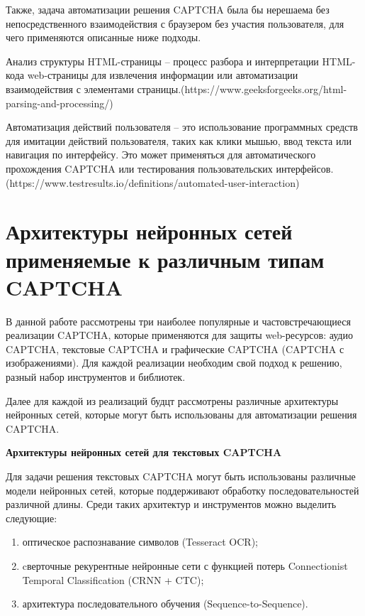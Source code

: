 Также, задача автоматизации решения CAPTCHA была бы нерешаема без 
непосредственного взаимодействия с браузером без участия пользователя, для чего 
применяются описанные ниже подходы.

Анализ структуры HTML-страницы -- процесс разбора и интерпретации HTML-кода 
web-страницы для извлечения информации или автоматизации взаимодействия с 
элементами страницы.(https://www.geeksforgeeks.org/html-parsing-and-processing/)

Автоматизация действий пользователя -- это использование программных средств для 
имитации действий пользователя, таких как клики мышью, ввод текста или навигация 
по интерфейсу. Это может применяться для автоматического прохождения CAPTCHA или 
тестирования пользовательских интерфейсов.(https://www.testresults.io/definitions/automated-user-interaction)

\section{Архитектуры нейронных сетей применяемые к различным типам CAPTCHA}

В данной работе рассмотрены три наиболее популярные и частовстречающиеся 
реализации CAPTCHA, которые применяются для защиты web-ресурсов: аудио CAPTCHA, 
текстовые CAPTCHA и графические CAPTCHA (CAPTCHA с изображениями). Для каждой 
реализации необходим свой подход к решению, разный набор инструментов и библиотек.

Далее для каждой из реализаций будцт рассмотрены различные архитектуры нейронных 
сетей, которые могут быть использованы для автоматизации решения CAPTCHA.

\textbf{Архитектуры нейронных сетей для текстовых CAPTCHA}

Для задачи решения текстовых CAPTCHA могут быть использованы различные модели 
нейронных сетей, которые поддерживают обработку последовательностей различной 
длины. Среди таких архитектур и инструментов можно выделить следующие:

\begin{enumerate}
    \item оптическое распознавание символов (Tesseract OCR);
    \item cверточные рекурентные нейронные сети с функцией потерь Connectionist 
    Temporal Classification (CRNN + CTC);
    \item архитектура последовательного обучения (Sequence-to-Sequence).
\end{enumerate}

